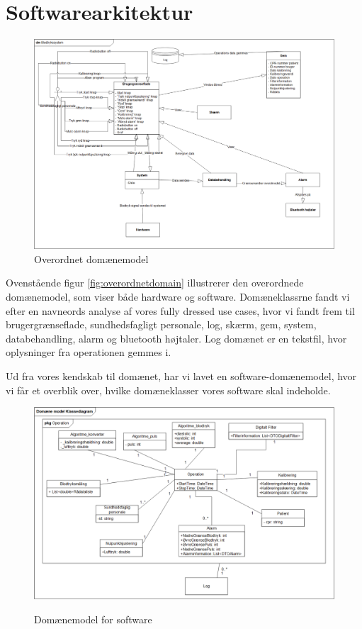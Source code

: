 \section{Softwarearkitektur}

	\begin{figure}[h!]
	\centering
	\includegraphics[width=1\linewidth]{Arkitektur_og_design/Softwarearkitektur/overordnetdomain}	
	\caption{Overordnet domænemodel}
	\label{fig:overordnetdomain}
\end{figure}

Ovenstående figur \vref{fig:overordnetdomain} illustrerer den overordnede domænemodel, som viser både hardware og software. Domæneklassrne fandt vi efter en navneords analyse af vores fully dressed use cases, hvor vi fandt frem til brugergrænseflade, sundhedsfagligt personale, log, skærm, gem, system, databehandling, alarm og bluetooth højtaler.  Log domænet er en tekstfil, hvor oplysninger fra operationen gemmes i.


  
Ud fra vores kendskab til domænet, har vi lavet en software-domænemodel, hvor vi får et overblik over, hvilke domæneklasser vores software skal indeholde. 

\clearpage

\begin{figure}[h!]
	\centering
	\includegraphics[width=1\linewidth]{Arkitektur_og_design/Softwarearkitektur/classdomain}
	\label{fig:classdomain}
	\caption{Domænemodel for software}
\end{figure}



